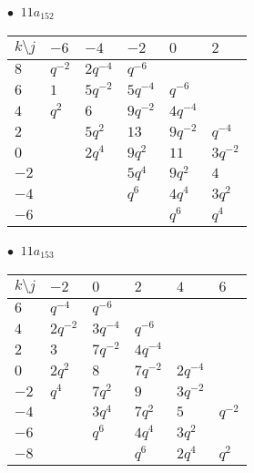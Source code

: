 \begin{minipage}{\linewidth}
$\bullet\ $ $11a_{152}$ \vspace{0.5em} \\
\begin{tabular}{l|lllll}
$k \setminus j$ & $-6$ & $-4$ & $-2$ & $0$ & $2$ \\
\hline
$8$ & $q^{-2}$ & $2q^{-4}$ & $q^{-6}$ &  &  \\
$6$ & $1$ & $5q^{-2}$ & $5q^{-4}$ & $q^{-6}$ &  \\
$4$ & $q^{2}$ & $6$ & $9q^{-2}$ & $4q^{-4}$ &  \\
$2$ &  & $5q^{2}$ & $13$ & $9q^{-2}$ & $q^{-4}$ \\
$0$ &  & $2q^{4}$ & $9q^{2}$ & $11$ & $3q^{-2}$ \\
$-2$ &  &  & $5q^{4}$ & $9q^{2}$ & $4$ \\
$-4$ &  &  & $q^{6}$ & $4q^{4}$ & $3q^{2}$ \\
$-6$ &  &  &  & $q^{6}$ & $q^{4}$ \\
\end{tabular}
\vspace{2em}
\end{minipage}
%
\begin{minipage}{\linewidth}
$\bullet\ $ $11a_{153}$ \vspace{0.5em} \\
\begin{tabular}{l|lllll}
$k \setminus j$ & $-2$ & $0$ & $2$ & $4$ & $6$ \\
\hline
$6$ & $q^{-4}$ & $q^{-6}$ &  &  &  \\
$4$ & $2q^{-2}$ & $3q^{-4}$ & $q^{-6}$ &  &  \\
$2$ & $3$ & $7q^{-2}$ & $4q^{-4}$ &  &  \\
$0$ & $2q^{2}$ & $8$ & $7q^{-2}$ & $2q^{-4}$ &  \\
$-2$ & $q^{4}$ & $7q^{2}$ & $9$ & $3q^{-2}$ &  \\
$-4$ &  & $3q^{4}$ & $7q^{2}$ & $5$ & $q^{-2}$ \\
$-6$ &  & $q^{6}$ & $4q^{4}$ & $3q^{2}$ &  \\
$-8$ &  &  & $q^{6}$ & $2q^{4}$ & $q^{2}$ \\
\end{tabular}
\vspace{2em}
\end{minipage}
%
